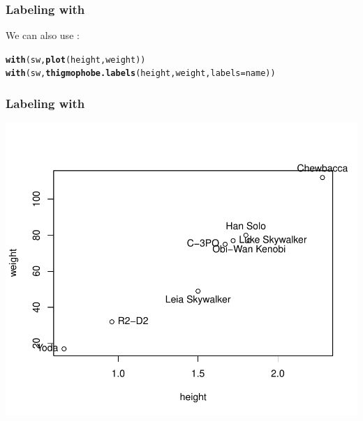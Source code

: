 \documentclass[12pt]{beamer}\usepackage[]{graphicx}\usepackage[]{color}
\makeatletter
\newcommand{\hlstd}[1]{\textcolor[rgb]{0.345,0.345,0.345}{#1}}%
\newcommand{\hlkwc}[1]{\textcolor[rgb]{0.333,0.667,0.333}{#1}}%
\newcommand{\hlkwd}[1]{\textcolor[rgb]{0.737,0.353,0.396}{\textbf{#1}}}%
\newenvironment{kframe}{%
 \def\at@end@of@kframe{}%
 \ifinner\ifhmode%
  \def\at@end@of@kframe{\end{minipage}}%
  \begin{minipage}{\columnwidth}%
 \fi\fi%
 \def\FrameCommand##1{\hskip\@totalleftmargin \hskip-\fboxsep
 \colorbox{shadecolor}{##1}\hskip-\fboxsep
     \hskip-\linewidth \hskip-\@totalleftmargin \hskip\columnwidth}%
 \MakeFramed {\advance\hsize-\width
   \@totalleftmargin\z@ \linewidth\hsize
   \@setminipage}}%
 {\par\unskip\endMakeFramed%
 \at@end@of@kframe}
\newenvironment{knitrout}{}{} %
\makeatother
\begin{document}

\begin{frame}[fragile]
\frametitle{Labeling with }

We can also use {\hilit {}}:
\begin{knitrout}\footnotesize
{}\color{fgcolor}\begin{kframe}
\begin{alltt}
\hlkwd{with}\hlstd{(sw,} \hlkwd{plot}\hlstd{(height, weight))}
\hlkwd{with}\hlstd{(sw,} \hlkwd{thigmophobe.labels}\hlstd{(height, weight,} \hlkwc{labels} \hlstd{= name))}
\end{alltt}
\end{kframe}
\end{knitrout}

\end{frame}


\begin{frame}[fragile]
\frametitle{Labeling with }

\begin{knitrout}\footnotesize
{}\color{fgcolor}

{\centering \includegraphics[width=.8\linewidth,height=.7\linewidth]{figure/sw_plot4-1} 

}



\end{knitrout}

\end{frame}
\end{document}
